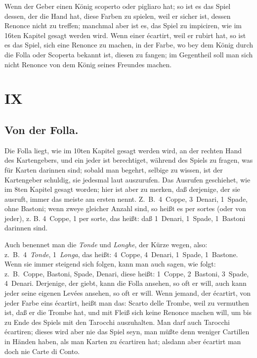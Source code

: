 \documentclass[11pt,a6paper,twoside]{article}
\begin{document}
Wenn der Geber einen König scoperto oder pigliaro hat; so ist es das Spiel dessen, der die Hand hat, diese Farben zu spielen, weil er sicher ist, dessen Renonce nicht zu treffen; manchmal aber ist es, das Spiel zu impiciren, wie im 16ten Kapitel gesagt werden wird. Wenn einer écartirt, weil er rubirt hat, so ist es das Spiel, sich eine Renonce zu machen, in der Farbe, wo bey dem König durch die Folla oder Scoperta bekannt ist, diesen zu fangen; im Gegentheil soll man sich nicht Renonce von dem König seines Freundes machen.

\section{IX}
\subsection{Von der Folla.}

Die Folla liegt, wie im 10ten Kapitel gesagt werden wird, an der rechten Hand des Kartengebers, und ein jeder ist berechtiget, während des Spiels zu fragen, was für Karten darinnen sind; sobald man begehrt, selbige zu wissen, ist der Kartengeber schuldig, sie jedesmal laut auszurufen. Das Ausrufen geschiehet, wie im 8ten Kapitel gesagt worden; hier ist aber zu merken, daß derjenige, der sie ausruft, immer das meiste am ersten nennt. Z.\ B.\ 4~Coppe, 3~Denari, 1~Spade, ohne Bastoni; wenn zweye gleicher Anzahl sind, so heißt es per sortes (oder von jeder), z. B. 4~Coppe, 1 per sorte, das heißt: daß 1~Denari, 1~Spade, 1~Bastoni darinnen sind.

Auch benennet man die \mbox{\textit{Tonde}} und \mbox{\textit{Longhe}}, der Kürze wegen, also: z.\ B.\ 4~\mbox{\textit{Tonde}}, 1~\mbox{\textit{Longa}}, das heißt: 4~Coppe, 4~Denari, 1~Spade, 1~Bastone. Wenn sie immer steigend sich folgen, kann man auch sagen, wie folgt: z.\ B.\ Coppe, Bastoni, Spade, Denari, diese heißt: 1~Coppe, 2~Bastoni, 3~Spade, 4~Denari. Derjenige, der giebt, kann die Folla ansehen, so oft er will, auch kann jeder seine eigenen Levées ansehen, so oft er will. Wenn jemand, der écartirt, von jeder Farbe eins écartirt, heißt man das: Scarto delle Trombe, weil zu vermuthen ist, daß er die Trombe hat, und mit Fleiß sich keine Renonce machen will, um bis zu Ende des Spiels mit den Tarocchi auszuhalten. Man darf auch Tarocchi écartiren; dieses wird aber nie das Spiel seyn, man müßte denn weniger Cartillen in Händen haben, als man Karten zu écartiren hat; alsdann aber écartirt man doch nie Carte di Conto.
\end{document}
